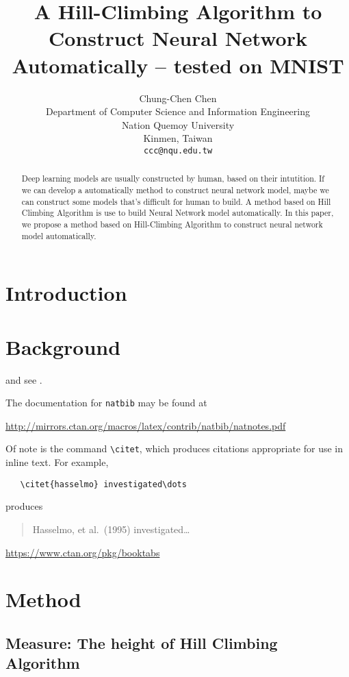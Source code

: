 \documentclass{article}
\title{A Hill-Climbing Algorithm to Construct Neural Network Automatically -- tested on MNIST}
\author{
  Chung-Chen Chen \\
  Department of Computer Science and Information Engineering\\
  Nation Quemoy University\\
  Kinmen, Taiwan \\
  \texttt{ccc@nqu.edu.tw} \\
}
\begin{document}
\maketitle

\begin{abstract}
Deep learning models are usually constructed by human, based on their intutition.
If we can develop a automatically method to construct neural network model, maybe we can construct some models that's difficult for human to build. 
A method based on Hill Climbing Algorithm is use to build Neural Network model automatically. 
In this paper, we propose a method based on Hill-Climbing Algorithm to construct neural network model automatically. 
\end{abstract}




\section{Introduction}

\section{Background}

 \cite{kour2014real,kour2014fast} and see \cite{hadash2018estimate}.

The documentation for \verb+natbib+ may be found at
\begin{center}
  \url{http://mirrors.ctan.org/macros/latex/contrib/natbib/natnotes.pdf}
\end{center}
Of note is the command \verb+\citet+, which produces citations
appropriate for use in inline text.  For example,
\begin{verbatim}
   \citet{hasselmo} investigated\dots
\end{verbatim}
produces
\begin{quote}
  Hasselmo, et al.\ (1995) investigated\dots
\end{quote}

\begin{center}
  \url{https://www.ctan.org/pkg/booktabs}
\end{center}

\section{Method}

\subsection{Measure: The height of Hill Climbing Algorithm}


  




\end{document}
